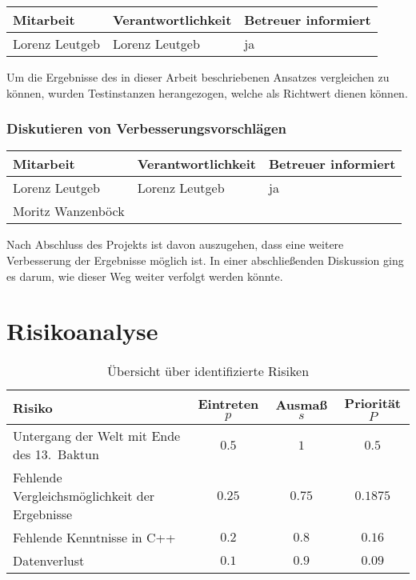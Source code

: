 \begin{center}
\begin{tabular}{lll}
	Mitarbeit & Verantwortlichkeit & Betreuer informiert \\
	\hline
	Lorenz Leutgeb & Lorenz Leutgeb & ja \\
\end{tabular}
\end{center}

Um die Ergebnisse des in dieser Arbeit beschriebenen Ansatzes vergleichen zu können, wurden Testinstanzen herangezogen, welche als Richtwert dienen können.

\subsubsection{ Diskutieren von Verbesserungsvorschlägen}

\begin{center}
\begin{tabular}{lll}
	Mitarbeit & Verantwortlichkeit & Betreuer informiert \\
	\hline
	Lorenz Leutgeb & Lorenz Leutgeb & ja \\
	Moritz Wanzenböck & & \\
\end{tabular}
\end{center}

Nach Abschluss des Projekts ist davon auszugehen, dass eine weitere Verbesserung der Ergebnisse möglich ist. In einer abschließenden Diskussion ging es darum, wie dieser Weg weiter verfolgt werden könnte.

\section{Risikoanalyse}
\begin{table}
\centering
\begin{tabular}{lccc}
Risiko & Eintreten $p$ & Ausmaß $s$ & Priorität $P$\\
\hline
Untergang der Welt mit Ende des 13.\ Baktun & $0.5$ & $1$ & $0.5$\\
Fehlende Vergleichsmöglichkeit der Ergebnisse & $0.25$ & $0.75$ & $0.1875$ \\
Fehlende Kenntnisse in C++ & $0.2$ & $0.8$ & $0.16$ \\
Datenverlust & $0.1$ & $0.9$ & $0.09$ \\
\end{tabular}
\caption{Übersicht über identifizierte Risiken}
\label{tab:risk}
\end{table}

